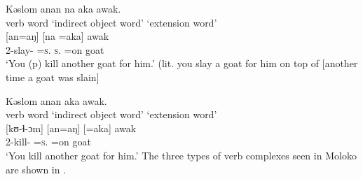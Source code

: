 \ea\label{ex:7:9}
Kəslom  anan  na  aka  awak.\\
verb word   \hspace{10pt}        ‘indirect object word’   \hspace{10pt}    ‘extension word’\\
\gll  [kʊ-ɬ-ɔm] \hspace{15pt}   [an=aŋ] \hspace{60pt}   [na  =aka] \hspace{30pt}   awak\\
2-slay-{\twoP} \hspace{15pt} {\DAT}=\textsc{s}.{\IO} \hspace{60pt}   \textsc{s}.{\DO}  =on \hspace{30pt}   goat\\
\glt ‘You (p) kill another goat for him.’ (lit. you slay a goat for him on top of [another time a goat was slain]
\z

\ea\label{ex:7:10}
 Kəslom  anan  aka  awak.\\
verb word    \hspace{10pt}             ‘indirect object word’ \hspace{10pt} ‘extension word’\\
\gll {}[kʊ-ɬ-ɔm] \hspace{15pt} [an=aŋ] \hspace{60pt} [=aka] \hspace{50pt}   awak\\
2-kill-{\twoP} \hspace{15pt} {\DAT}=\textsc{s}.{\IO} \hspace{60pt} =on \hspace{50pt}   goat\\
\glt ‘You kill another goat for him.’
\z
The three types of verb complexes seen in Moloko are shown in .

